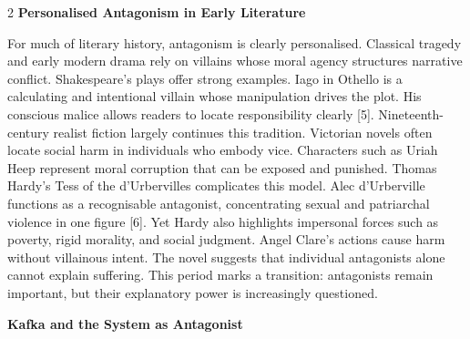 \documentclass[12pt,a4paper]{article}
\begin{document}
\begin{multicols}{2}
\vspace{8pt}
\noindent
\textbf{Personalised Antagonism in Early Literature}

\noindent
For much of literary history, antagonism is clearly personalised. 
Classical tragedy and early modern drama rely on villains 
whose moral agency structures narrative conflict. Shakespeare’s 
plays offer strong examples. Iago in Othello is a calculating and 
intentional villain whose manipulation drives the plot. His 
conscious malice allows readers to locate responsibility clearly 
[5]. 
Nineteenth-century realist fiction largely continues this 
tradition. Victorian novels often locate social harm in 
individuals who embody vice. Characters such as Uriah Heep 
represent moral corruption that can be exposed and punished. 
Thomas Hardy’s Tess of the d’Urbervilles complicates this 
model. Alec d’Urberville functions as a recognisable 
antagonist, concentrating sexual and patriarchal violence in one 
figure [6]. Yet Hardy also highlights impersonal forces such as 
poverty, rigid morality, and social judgment. Angel Clare’s 
actions cause harm without villainous intent. The novel 
suggests that individual antagonists alone cannot explain 
suffering. 
This period marks a transition: antagonists remain important, 
but their explanatory power is increasingly questioned. 

\vspace{8pt}
\noindent
\textbf{Kafka and the System as Antagonist}


\end{multicols}
\end{document}
